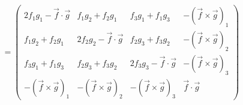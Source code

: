 \begin{equation}
= \left(
\begin{array}{cccc}
2f_{1} g_{1}- \vec{f} \cdot \vec{g} & f_{1}g_{2}+f_{2}g_{1} & f_{3}g_{1}+f_{1}g_{3} &
-(\vec{f} \times \vec{g})_{1} \\
f_{1}g_{2}+f_{2}g_{1} & 2f_{2} g_{2}- \vec{f} \cdot \vec{g} & f_{2}g_{3}+f_{3}g_{2} &
-(\vec{f} \times \vec{g})_{2} \\
f_{3}g_{1}+f_{1}g_{3} & f_{2}g_{3}+f_{3}g_{2} & 2f_{3} g_{3}- \vec{f} \cdot \vec{g} &
-(\vec{f} \times \vec{g})_{3} \\
-(\vec{f} \times \vec{g})_{1} & -(\vec{f} \times \vec{g})_{2} & -(\vec{f} \times \vec{g})_{3}
& \vec{f} \cdot \vec{g}
\end{array}
\right)~~~
\end{equation}


